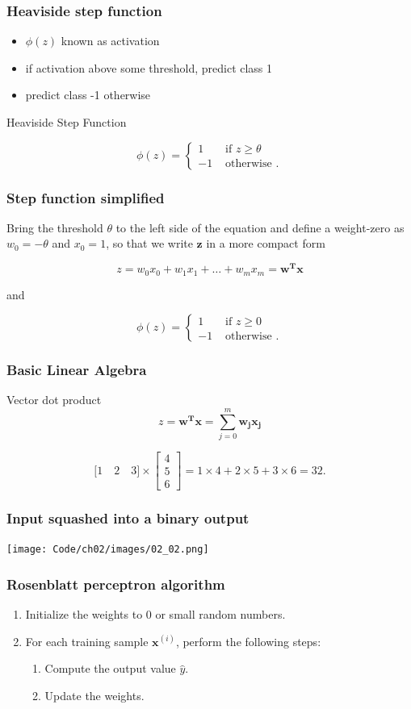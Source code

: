 \documentclass{beamer}
\begin{document}
\begin{frame}
  \frametitle{Heaviside step function}
  \begin{itemize}
  \item $\phi(z)$ known as activation
  \item if activation above some threshold, predict class 1
  \item predict class -1 otherwise
  \end{itemize}
  Heaviside Step Function

  \[ \phi(z) = \begin{cases}
    1  & \text{ if } z \ge \theta \\
    -1 & \text{ otherwise }.
  \end{cases}
  \]
\end{frame}

\begin{frame}
\frametitle{Step function simplified}
Bring the threshold $\theta$ to the left side of the equation and define a weight-zero as $w_0 = -\theta$ and $x_0=1$, so that we write $\mathbf{z}$ in a more compact form

\[
z  = w_0 x_0 + w_1 x_1 + \dots + w_m x_m = \mathbf{w^T x}
\]

and

\[ \phi(z) = \begin{cases}
      1  & \text{ if } z \ge 0 \\
      -1 & \text{ otherwise }.
   \end{cases}
\]
\end{frame}

\begin{frame}
  \frametitle{Basic Linear Algebra}
  Vector dot product
  \[
  z  = \mathbf{w^T x} = \sum_{j=0}^{m} \mathbf{w_j} \mathbf{x_j}
  \]

  \[
  \big[1 \quad 2 \quad 3 \big] \times \begin{bmatrix}
    4  \\
    5  \\
    6
  \end{bmatrix} = 1 \times 4 + 2 \times 5 + 3 \times 6 = 32.
  \]
\end{frame}

\begin{frame}
  \frametitle{Input squashed into a binary output}
  \texttt{[image: Code/ch02/images/02\_02.png]}
\end{frame}

\begin{frame}
  \frametitle{Rosenblatt perceptron algorithm}
  \begin{enumerate}
  \item Initialize the weights to 0 or small random numbers.
  \item For each training sample $\mathbf{x}^{(i)}$, perform the following steps:
    \begin{enumerate}
    \item Compute the output value $\hat{y}$.
    \item Update the weights.
    \end{enumerate}
  \end{enumerate}
\end{frame}
\end{document}
